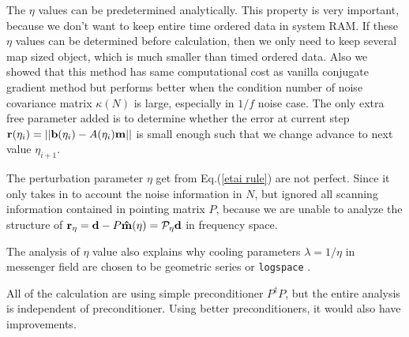 \documentclass[11pt, letterpaper]{article}
\newcommand{\vbd}{\vb{d}}
\newcommand{\vbm}{\vb{m}}
\newcommand{\vbb}{\vb{b}}
\newcommand{\hatm}{\vb{\hat{m}}}
\newcommand{\Pdagger}{P^{\dagger}}
\begin{document}
The $\eta$ values can be predetermined analytically.
This property is very important, because we don't want to keep entire time
ordered data in system RAM.
If these $\eta$ values can be determined before calculation, then we only need
to keep several map sized object, which is much smaller than timed ordered 
data.
Also we showed that this method has same computational cost as vanilla
conjugate gradient method but performs better when the condition number of 
noise covariance matrix $\kappa(N)$ is large, especially in $1/f$ noise case.
The only extra free parameter added is to determine whether the error at
current step $\vb{r}(\eta_i) = \qty||\vbb(\eta_i) - A(\eta_i) \vbm||$ is small
enough such that we change advance to next value $\eta_{i+1}$.

The perturbation parameter $\eta$ get from Eq.(\ref{etai rule}) are not
perfect. Since it only takes in to account the noise information in $N$,
but ignored all scanning information contained in pointing matrix $P$, because
we are unable to analyze the structure of
$\vb{r}_{\eta} = \vbd - P\hatm(\eta) = \mathcal{P}_{\eta} \vbd$ in frequency
space.

The analysis of $\eta$ value also explains why cooling parameters
$\lambda=1/\eta$ in messenger field are chosen to be geometric series or
\texttt{logspace} \cite{Huffenberger_2018}.

All of the calculation are using simple preconditioner $\Pdagger P$, but 
the entire analysis is independent of preconditioner.
Using better preconditioners, it would also have improvements.





\medskip



\end{document}
